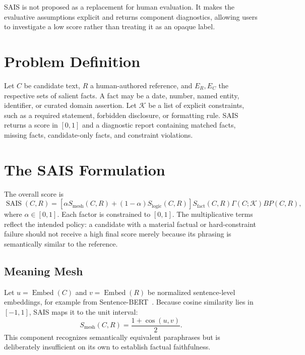 \documentclass[11pt]{article}
\begin{document}
SAIS is not proposed as a replacement for human evaluation. It makes the
evaluative assumptions explicit and returns component diagnostics, allowing
users to investigate a low score rather than treating it as an opaque label.

\section{Problem Definition}

Let $C$ be candidate text, $R$ a human-authored reference, and
$E_R,E_C$ the respective sets of salient facts. A fact may be a date, number,
named entity, identifier, or curated domain assertion. Let $\mathcal{K}$ be a
list of explicit constraints, such as a required statement, forbidden
disclosure, or formatting rule. SAIS returns a score in $[0,1]$ and a
diagnostic report containing matched facts, missing facts, candidate-only facts,
and constraint violations.

\section{The SAIS Formulation}

The overall score is
\begin{equation}
\operatorname{SAIS}(C,R)=
[\alpha S_{\mathrm{mesh}}(C,R)+(1-\alpha)S_{\mathrm{logic}}(C,R)]
S_{\mathrm{fact}}(C,R)\Gamma(C;\mathcal{K})BP(C,R),
\label{eq:sais}
\end{equation}
where $\alpha\in[0,1]$. Each factor is constrained to $[0,1]$. The
multiplicative terms reflect the intended policy: a candidate with a material
factual or hard-constraint failure should not receive a high final score merely
because its phrasing is semantically similar to the reference.

\subsection{Meaning Mesh}

Let $u=\operatorname{Embed}(C)$ and $v=\operatorname{Embed}(R)$ be normalized
sentence-level embeddings, for example from Sentence-BERT~\citep{reimers2019sentencebert}.
Because cosine similarity lies in $[-1,1]$, SAIS maps it to the unit interval:
\begin{equation}
S_{\mathrm{mesh}}(C,R)=\frac{1+\cos(u,v)}{2}.
\end{equation}
This component recognizes semantically equivalent paraphrases but is
deliberately insufficient on its own to establish factual faithfulness.
\end{document}
